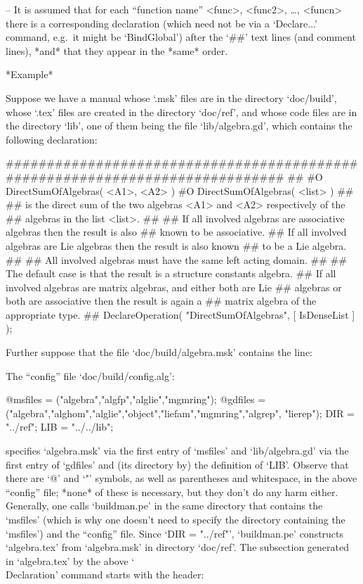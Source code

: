 \item{--} 
It is assumed that for each ``function  name''  <func>,  <func2>,  \dots,
<funcn> there is a corresponding {\GAP} declaration (which  need  not  be
via a `Declare...' command, e.g.~it  might  be  `BindGlobal')  after  the
`\#\#' text lines (and comment lines), *and*  that  they  appear  in  the
*same* order.

\endlist

\goodbreak%

*Example*

Suppose we have a manual whose `.msk' files are in the directory `doc/build',
whose `.tex' files are created in the directory `doc/ref',
and whose {\GAP} code files are in the directory `lib',
one of them being the file `lib/algebra.gd',
which contains the following declaration:

\begintt
#############################################################################
##
#O  DirectSumOfAlgebras( <A1>, <A2> )
#O  DirectSumOfAlgebras( <list> )
##
##  is the direct sum of the two algebras <A1> and <A2> respectively of the
##  algebras in the list <list>.
##
##  If all involved algebras are associative algebras then the result is also
##  known to be associative.
##  If all involved algebras are Lie algebras then the result is also known
##  to be a Lie algebra.
##
##  All involved algebras must have the same left acting domain.
##
##  The default case is that the result is a structure constants algebra.
##  If all involved algebras are matrix algebras, and either both are Lie
##  algebras or both are associative then the result is again a
##  matrix algebra of the appropriate type.
##
DeclareOperation( "DirectSumOfAlgebras", [ IsDenseList ] );
\endtt

Further suppose that the file `doc/build/algebra.msk' contains the line:

\begintt
{}
\endtt

The ``config'' file `doc/build/config.alg':

\begintt
@msfiles = ("algebra","algfp","alglie","mgmring");
@gdfiles = ("algebra","alghom","alglie","object","liefam","mgmring","algrep",
            "lierep");
DIR = "../ref";
LIB = "../../lib";
\endtt

specifies  `algebra.msk'  via  the   first   entry   of   `msfiles'   and
`lib/algebra.gd' via the first entry of `gdfiles' and (its directory  by)
the definition of `LIB'. Observe that there are `@' and `"'  symbols,  as
well as parentheses and whitespace, in the above ``config'' file;  *none*
of these is necessary, but they don't do any harm either. Generally,  one
calls `buildman.pe' in the same directory  that  contains  the  `msfiles'
(which is why one doesn't need to specify the  directory  containing  the
`msfiles') and the ``config'' file. Since `DIR = "../ref"', `buildman.pe'
constructs `algebra.tex' from `algebra.msk' in directory  `doc/ref'.  The
subsection  generated  in  `algebra.tex'  by  the  above  `\\Declaration'
command starts with the header:

